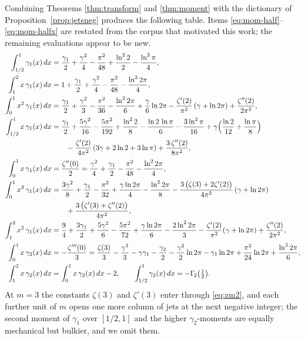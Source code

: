 \documentclass[11pt]{article}
\theoremstyle{remark}
\begin{document}
Combining Theorems \ref{thm:transform} and \ref{thm:moment} with the
dictionary of Proposition~\ref{prop:jetsneg} produces the following table.
Items \eqref{eq:mom-half}--\eqref{eq:mom-halfx} are restated from the
corpus that motivated this work; the remaining evaluations appear to be
new.
\begin{align}
\int_{1/2}^{1}\gamma_1(x)\,dx
&=\frac{\gamma_1}{2}+\frac{\gamma^2}{4}-\frac{\pi^2}{48}
+\frac{\ln^2 2}{2}-\frac{\ln^2\pi}{4},
\label{eq:mom-half}\\
\int_{1}^{2}x\,\gamma_1(x)\,dx
&=1+\frac{\gamma_1}{2}+\frac{\gamma^2}{4}-\frac{\pi^2}{48}
-\frac{\ln^2 2\pi}{4},
\label{eq:mom-12x}\\
\int_{0}^{1}x^2\,\gamma_1(x)\,dx
&=\frac{\gamma_1}{2}+\frac{\gamma^2}{3}-\frac{\pi^2}{36}
-\frac{\ln^2 2\pi}{6}+\frac{\gamma}{6}\ln 2\pi
-\frac{\zeta'(2)}{\pi^2}\,(\gamma+\ln 2\pi)+\frac{\zeta''(2)}{2\pi^2},
\label{eq:mom-sq}\\
\int_{1/2}^{1}x\,\gamma_1(x)\,dx
&=\frac{\gamma_1}{2}+\frac{5\gamma^2}{16}-\frac{5\pi^2}{192}
+\frac{\ln^2 2}{8}-\frac{\ln 2\,\ln\pi}{6}-\frac{3\ln^2\pi}{16}
+\gamma\Bigl(\frac{\ln 2}{12}+\frac{\ln\pi}{8}\Bigr)\notag\\
&\qquad
-\frac{\zeta'(2)}{4\pi^2}\,(3\gamma+2\ln 2+3\ln\pi)
+\frac{3\,\zeta''(2)}{8\pi^2},
\label{eq:mom-halfx}\\[2pt]
\int_{0}^{1}x\,\gamma_1(x)\,dx
&=\frac{\zeta''(0)}{2}
=\frac{\gamma^2}{4}+\frac{\gamma_1}{2}-\frac{\pi^2}{48}-\frac{\ln^2 2\pi}{4},
\label{eq:mom-x}\\
\int_{0}^{1}x^3\,\gamma_1(x)\,dx
&=\frac{3\gamma^2}{8}+\frac{\gamma_1}{2}-\frac{\pi^2}{32}
+\frac{\gamma\ln2\pi}{4}-\frac{\ln^2 2\pi}{8}
-\frac{3\,\bigl(\zeta(3)+2\zeta'(2)\bigr)}{4\pi^2}\,(\gamma+\ln2\pi)\notag\\
&\qquad+\frac{3\,\bigl(\zeta'(3)+\zeta''(2)\bigr)}{4\pi^2},
\label{eq:mom-x3}\\
\int_{1}^{2}x^2\,\gamma_1(x)\,dx
&=\frac94+\frac{3\gamma_1}{2}+\frac{5\gamma^2}{6}-\frac{5\pi^2}{72}
+\frac{\gamma\ln2\pi}{6}-\frac{2\ln^2 2\pi}{3}
-\frac{\zeta'(2)}{\pi^2}(\gamma+\ln2\pi)+\frac{\zeta''(2)}{2\pi^2},
\label{eq:mom-12x2}\\[2pt]
\int_{0}^{1}x\,\gamma_2(x)\,dx
&=-\frac{\zeta'''(0)}{3}
=\frac{\zeta(3)}{3}-\frac{\gamma^3}{3}-\gamma\gamma_1-\frac{\gamma_2}{2}
-\frac{\gamma^2}{2}\ln2\pi-\gamma_1\ln2\pi
+\frac{\pi^2}{24}\ln2\pi+\frac{\ln^3 2\pi}{6},
\label{eq:mom-g2}\\
\int_{1}^{2}x\,\gamma_2(x)\,dx
&=\int_{0}^{1}x\,\gamma_2(x)\,dx-2,
\qquad
\int_{1/2}^{1}\gamma_2(x)\,dx=-\Gamma_{\!2}\bigl(\tfrac12\bigr) .
\label{eq:mom-g2b}
\end{align}
At $m=3$ the constants $\zeta(3)$ and $\zeta'(3)$ enter through
\eqref{eq:zm2}, and each further unit of $m$ opens one more column of jets
at the next negative integer; the second moment of $\gamma_1$ over
$[1/2,1]$ and the higher $\gamma_2$-moments are equally mechanical but
bulkier, and we omit them.
\end{document}
